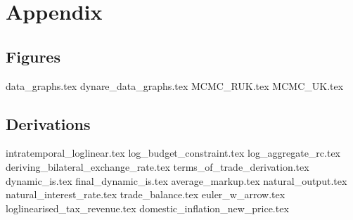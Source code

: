 \section{Appendix}
\subsection{Figures}
{data_graphs.tex}
{dynare_data_graphs.tex}
{MCMC_RUK.tex}
{MCMC_UK.tex}

\subsection{Derivations}
\renewcommand{\theequation}{A.\arabic{equation}}
{intratemporal_loglinear.tex}
{log_budget_constraint.tex}
{log_aggregate_rc.tex}
{deriving_bilateral_exchange_rate.tex}
{terms_of_trade_derivation.tex}
{dynamic_is.tex}
{final_dynamic_is.tex}
{average_markup.tex}
{natural_output.tex}
{natural_interest_rate.tex}
{trade_balance.tex}
{euler_w_arrow.tex}
{loglinearised_tax_revenue.tex}
{domestic_inflation_new_price.tex}
